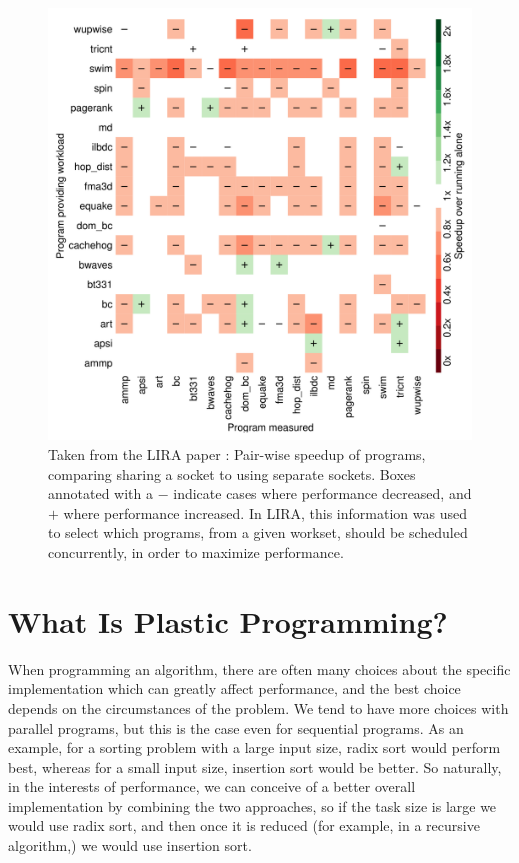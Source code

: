 \begin{figure}
	\includegraphics[width=\textwidth]{graphics/lira_pairwise_speedup.png}
	\caption{Taken from the LIRA paper \cite{lira}: Pair-wise speedup of programs, comparing sharing a socket to using separate sockets. Boxes annotated with a $-$ indicate cases where performance decreased, and $+$ where performance increased. In LIRA, this information was used to select which programs, from a given workset, should be scheduled concurrently, in order to maximize performance.}
	\label{fig:lira_pairwise_speedup}
\end{figure}



\section{What Is Plastic Programming?}

When programming an algorithm, there are often many choices about the specific implementation which can greatly affect performance, and the best choice depends on the circumstances of the problem. We tend to have more choices with parallel programs, but this is the case even for sequential programs. As an example, for a sorting problem with a large input size, radix sort would perform best, whereas for a small input size, insertion sort would be better. So naturally, in the interests of performance, we can conceive of a better overall implementation by combining the two approaches, so if the task size is large we would use radix sort, and then once it is reduced (for example, in a recursive algorithm,) we would use insertion sort. 

